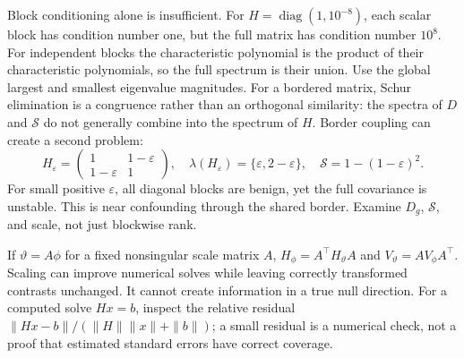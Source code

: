 \documentclass[11pt,a4paper]{article}
\newcommand{\diag}{\operatorname{diag}}
\numberwithin{equation}{section}
\begin{document}
Block conditioning alone is insufficient.
For $H=\diag(1,10^{-8})$, each scalar block has condition number one,
but the full matrix has condition number $10^8$.
For independent blocks the characteristic polynomial is the product
of their characteristic polynomials, so the full spectrum is their
union. Use the global largest and smallest eigenvalue magnitudes.
For a bordered matrix, Schur elimination is a congruence rather than
an orthogonal similarity: the spectra of $D$ and ${\mathcal S}$ do not generally
combine into the spectrum of $H$.
Border coupling can create a second problem:
\begin{equation}
 H_\varepsilon=\begin{pmatrix}1&1-\varepsilon\\1-\varepsilon&1\end{pmatrix},
 \quad \lambda(H_\varepsilon)=\{\varepsilon,2-\varepsilon\},\quad
 {\mathcal S}=1-(1-\varepsilon)^2 .
\end{equation}
For small positive $\varepsilon$, all diagonal blocks are benign,
yet the full covariance is unstable. This is near confounding through
the shared border. Examine $D_g$, ${\mathcal S}$, and scale, not just blockwise rank.

If $\vartheta=A\phi$ for a fixed nonsingular scale matrix $A$,
$H_\phi=A^\top H_\vartheta A$ and $V_\vartheta=AV_\phi A^\top$.
Scaling can improve numerical solves while leaving correctly transformed
contrasts unchanged. It cannot create information in a true null direction.
For a computed solve $Hx=b$, inspect the relative residual
$\|Hx-b\|/(\|H\|\|x\|+\|b\|)$; a small residual is a numerical check,
not a proof that estimated standard errors have correct coverage.
\end{document}
